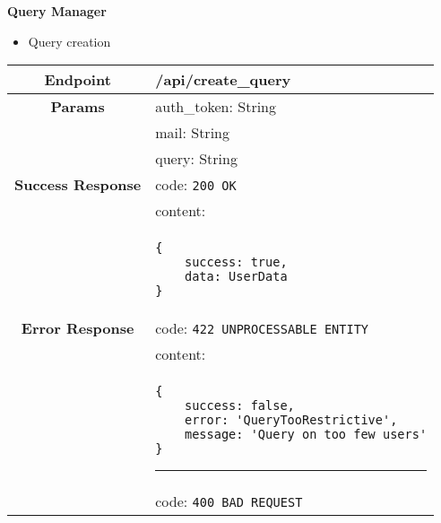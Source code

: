    \textbf{Query Manager}
    \begin{itemize}
        \item Query creation
    \end{itemize}
    \begin{adjustwidth}{1cm}{}
        \begin{tabular}{|c|l|}
            \hline
            \textbf{Endpoint} & /api/create\_query \\
            \hline
            \textbf{Params} & auth\_token: String \\
            &                 mail: String \\
            &                 query: String \\
            \hline
            \textbf{Success Response} & code: \texttt{200 OK} \\
            &                           content: \\
            & \begin{minipage}[t]{0.5\textwidth}
                \begin{adjustwidth}{1.5cm}{}
                \begin{verbatim}
{
    success: true, 
    data: UserData
}
                \end{verbatim}
                \end{adjustwidth}
              \end{minipage} \\
              \hline
            \textbf{Error Response} & code: \texttt{422 UNPROCESSABLE ENTITY} \\
            &                         content: \\
            & \begin{minipage}[t]{0.7\textwidth}
                \begin{adjustwidth}{1.5cm}{}
                \begin{verbatim}
{
    success: false, 
    error: 'QueryTooRestrictive',
    message: 'Query on too few users'
}
                \end{verbatim}
                \end{adjustwidth}
                \par\noindent\rule{\textwidth}{1pt}
                 \vspace{4pt}
              \end{minipage} \\
              &                     code: \texttt{400 BAD REQUEST} \\

\end{tabular}
\end{adjustwidth}
